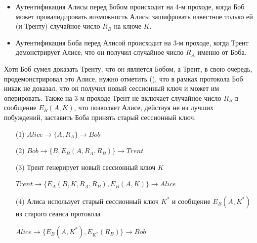 \begin{itemize}
    \item Аутентификация Алисы перед Бобом происходит на 4-м проходе, когда Боб может провалидировать возможность Алисы зашифровать известное только ей (и Тренту) случайное число $R_B$ на ключе $K$.
    \item Аутентификация Боба перед Алисой происходит на 3-м проходе, когда Трент демонстрирует Алисе, что он получил случайное число $R_A$ именно от Боба.
\end{itemize}

Хотя Боб сумел доказать Тренту, что он является Бобом, а Трент, в свою очередь, продемонстрировал это Алисе, нужно отметить (\cite{Zhou:Yu:Pan:Wang:2016}), что в рамках протокола Боб никак не доказал, что он получил новый сессионный ключ и может им оперировать. Также на 3-м проходе Трент не включает случайное число $R_B$ в сообщение $E_B(A, K)$, что позволяет Алисе, действуя не из лучших побуждений, заставить Боба принять старый сессионный ключ.

\begin{samepage}\begin{itemize}
	\item[(1)] $Alice \to \{ A, R_A \} \to Bob$
	\item[(2)] $Bob \to \{ B, E_B( A, R_A, R_B ) \} \to Trent$
	\item[(3)] Трент генерирует новый сессионный ключ $K$
	\item[{}] $Trent \to \{ E_A( B, K, R_A, R_B ), E_B(A, K) \} \to Alice$
	\item[(4)] Алиса использует старый сессионный ключ $K^*$ и сообщение $E_B( A, K^* )$ из старого сеанса протокола
	\item[{}] $Alice \to \{ E_B( A, K^* ), E_{K^*}( R_B ) \} \to Bob$
\end{itemize}\end{samepage}

